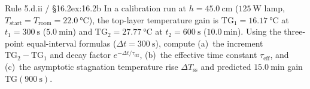 \begin{twocol}[0.48]
\begin{workedexample}{Rule 5.d.ii / §16.2}{ex:16.2b}
In a calibration run at $h = \SI{45.0}{\centi\meter}$ ($\SI{125}{\watt}$ lamp, $T_{\mathrm{start}} = T_{\mathrm{room}} = \SI{22.0}{\celsius}$), the top-layer temperature gain is $\mathrm{TG}_1 = \SI{16.17}{\celsius}$ at $t_1 = \SI{300}{\second}$ ($\SI{5.0}{\minute}$) and $\mathrm{TG}_2 = \SI{27.77}{\celsius}$ at $t_2 = \SI{600}{\second}$ ($\SI{10.0}{\minute}$). Using the three-point equal-interval formulas ($\Delta t = \SI{300}{\second}$), compute (a)~the increment $\mathrm{TG}_2 - \mathrm{TG}_1$ and decay factor $e^{-\Delta t/\tau_{\mathrm{eff}}}$, (b)~the effective time constant $\tau_{\mathrm{eff}}$, and (c)~the asymptotic stagnation temperature rise $\Delta T_{\mathrm{ss}}$ and predicted $\SI{15.0}{\minute}$ gain $\mathrm{TG}(\SI{900}{\second})$.


\end{workedexample}
\end{twocol}
